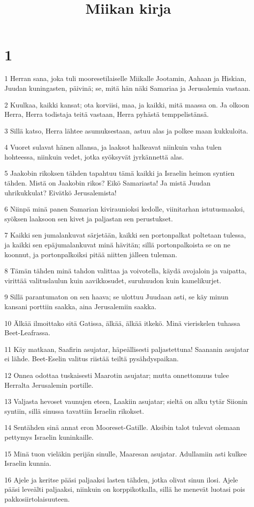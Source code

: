 

\title{Miikan kirja}


\chapter{1}

\par 1 Herran sana, joka tuli mooresetilaiselle Miikalle Jootamin, Aahaan ja Hiskian, Juudan kuningasten, päivinä; se, mitä hän näki Samariaa ja Jerusalemia vastaan.
\par 2 Kuulkaa, kaikki kansat; ota korviisi, maa, ja kaikki, mitä maassa on. Ja olkoon Herra, Herra todistaja teitä vastaan, Herra pyhästä temppelistänsä.
\par 3 Sillä katso, Herra lähtee asumuksestaan, astuu alas ja polkee maan kukkuloita.
\par 4 Vuoret sulavat hänen allansa, ja laaksot halkeavat niinkuin vaha tulen hohteessa, niinkuin vedet, jotka syöksyvät jyrkännettä alas.
\par 5 Jaakobin rikoksen tähden tapahtuu tämä kaikki ja Israelin heimon syntien tähden. Mistä on Jaakobin rikos? Eikö Samariasta! Ja mistä Juudan uhrikukkulat? Eivätkö Jerusalemista!
\par 6 Niinpä minä panen Samarian kiviraunioksi kedolle, viinitarhan istutusmaaksi, syöksen laaksoon sen kivet ja paljastan sen perustukset.
\par 7 Kaikki sen jumalankuvat särjetään, kaikki sen portonpalkat poltetaan tulessa, ja kaikki sen epäjumalankuvat minä hävitän; sillä portonpalkoista se on ne koonnut, ja portonpalkoiksi pitää niitten jälleen tuleman.
\par 8 Tämän tähden minä tahdon valittaa ja voivotella, käydä avojaloin ja vaipatta, virittää valituslaulun kuin aavikkosudet, suruhuudon kuin kamelikurjet.
\par 9 Sillä parantumaton on sen haava; se ulottuu Juudaan asti, se käy minun kansani porttiin saakka, aina Jerusalemiin saakka.
\par 10 Älkää ilmoittako sitä Gatissa, älkää, älkää itkekö. Minä vieriskelen tuhassa Beet-Leafrassa.
\par 11 Käy matkaan, Saafirin asujatar, häpeällisesti paljastettuna! Saananin asujatar ei lähde. Beet-Eselin valitus riistää teiltä pysähdyspaikan.
\par 12 Onnea odottaa tuskaisesti Maarotin asujatar; mutta onnettomuus tulee Herralta Jerusalemin portille.
\par 13 Valjasta hevoset vaunujen eteen, Laakiin asujatar; sieltä on alku tytär Siionin syntiin, sillä sinussa tavattiin Israelin rikokset.
\par 14 Sentähden sinä annat eron Mooreset-Gatille. Aksibin talot tulevat olemaan pettymys Israelin kuninkaille.
\par 15 Minä tuon vieläkin perijän sinulle, Maaresan asujatar. Adullamiin asti kulkee Israelin kunnia.
\par 16 Ajele ja keritse pääsi paljaaksi lasten tähden, jotka olivat sinun ilosi. Ajele pääsi leveälti paljaaksi, niinkuin on korppikotkalla, sillä he menevät luotasi pois pakkosiirtolaisuuteen.

